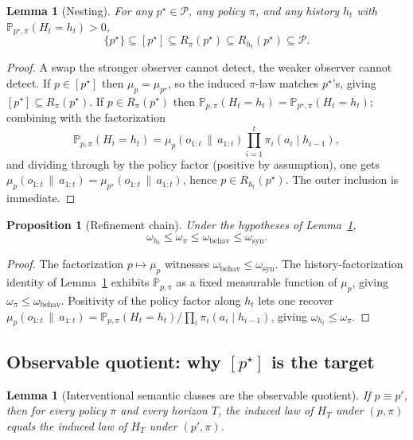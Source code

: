 \documentclass[11pt]{article}
\newtheorem{proposition}[theorem]{Proposition}
\newtheorem{lemma}[theorem]{Lemma}
\theoremstyle{definition}
\theoremstyle{remark}
\newcommand{\Pcal}{\mathcal{P}}
\newcommand{\Prob}{\mathbb{P}}
\newcommand{\givena}{\,\|\,}
\begin{document}
\begin{lemma}[Nesting]
\label{lem:nesting}
For any $p^\star\in\Pcal$, any policy $\pi$, and any history $h_t$ with $\Prob_{p^\star,\pi}(H_t=h_t)>0$,
\[
\{p^\star\}\subseteq [p^\star]\subseteq R_\pi(p^\star)\subseteq R_{h_t}(p^\star)\subseteq \Pcal.
\]
\end{lemma}

\begin{proof}
A swap the stronger observer cannot detect, the weaker observer cannot detect. If $p\in[p^\star]$ then $\mu_p=\mu_{p^\star}$, so the induced $\pi$-law matches $p^\star$'s, giving $[p^\star]\subseteq R_\pi(p^\star)$. If $p\in R_\pi(p^\star)$ then $\Prob_{p,\pi}(H_t=h_t)=\Prob_{p^\star,\pi}(H_t=h_t)$; combining with the factorization
\[
\Prob_{p,\pi}(H_t=h_t)=\mu_p(o_{1:t}\givena a_{1:t})\prod_{i=1}^t \pi_i(a_i\mid h_{i-1}),
\]
and dividing through by the policy factor (positive by assumption), one gets $\mu_p(o_{1:t}\givena a_{1:t})=\mu_{p^\star}(o_{1:t}\givena a_{1:t})$, hence $p\in R_{h_t}(p^\star)$. The outer inclusion is immediate.
\end{proof}

\begin{proposition}[Refinement chain]
\label{prop:refinement-chain}
Under the hypotheses of Lemma~\ref{lem:nesting},
\[
\omega_{h_t}\le\omega_\pi\le\omega_{\mathrm{behav}}\le\omega_{\mathrm{syn}}.
\]
\end{proposition}

\begin{proof}
The factorization $p\mapsto\mu_p$ witnesses $\omega_{\mathrm{behav}}\le\omega_{\mathrm{syn}}$. The history-factorization identity of Lemma~\ref{lem:nesting} exhibits $\Prob_{p,\pi}$ as a fixed measurable function of $\mu_p$, giving $\omega_\pi\le\omega_{\mathrm{behav}}$. Positivity of the policy factor along $h_t$ lets one recover $\mu_p(o_{1:t}\givena a_{1:t})=\Prob_{p,\pi}(H_t=h_t)/\prod_i\pi_i(a_i\mid h_{i-1})$, giving $\omega_{h_t}\le\omega_\pi$.
\end{proof}

\subsection{Observable quotient: why $[p^\star]$ is the target}

\begin{lemma}[Interventional semantic classes are the observable quotient]
\label{lem:observable-quotient}
If $p\equiv p'$, then for every policy $\pi$ and every horizon $T$, the induced law of $H_T$ under $(p,\pi)$ equals the induced law of $H_T$ under $(p',\pi)$.
\end{lemma}
\end{document}
